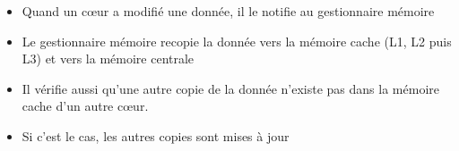 \documentclass{beamer}
\begin{document}
\begin{frame}

\vfill
\begin{itemize}
\item Quand un c\oe ur a modifi\'e une donn\'ee, il le notifie au gestionnaire m\'emoire
\vfill
\item Le gestionnaire m\'emoire recopie la donn\'ee vers la m\'emoire cache (L1, L2 puis L3) et vers la m\'emoire centrale
\vfill
\item Il v\'erifie aussi qu'une autre copie de la donn\'ee n'existe pas dans la m\'emoire cache d'un autre c\oe ur.
\vfill
\item Si c'est le cas, les autres copies sont mises \`a jour
\end{itemize}
	\vfill
\end{frame}
\end{document}
